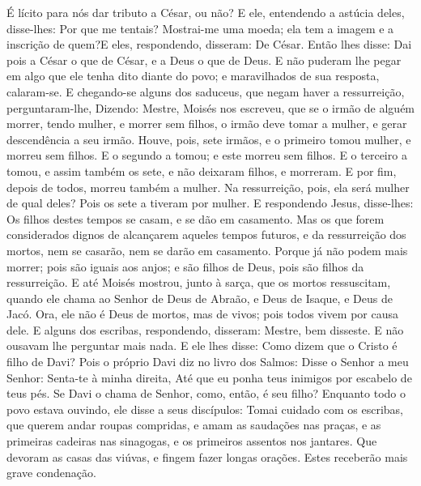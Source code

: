{  É lícito para nós dar tributo a César, ou não?
  E ele, entendendo a astúcia deles, disse-lhes: Por que me tentais?
  Mostrai-me uma moeda; ela tem a imagem e a inscrição de quem?E eles, respondendo, disseram: De César.
  Então lhes disse: Dai pois a César o que
{} de César, e a Deus o que
{} de Deus.
  E não puderam lhe pegar em algo que ele tenha dito diante do povo; e maravilhados de sua resposta, calaram-se.
  E chegando-se alguns dos saduceus, que negam haver a ressurreição, perguntaram-lhe,
  Dizendo: Mestre, Moisés nos escreveu, que se o irmão de alguém morrer, tendo mulher, e morrer sem filhos, o irmão deve tomar a mulher, e gerar descendência a seu irmão.
  Houve, pois, sete irmãos, e o primeiro tomou mulher, e morreu sem filhos.
  E o segundo a tomou; e
{} este morreu sem filhos.
  E o terceiro a tomou, e assim também os sete, e não deixaram filhos, e morreram.
  E por fim, depois de todos, morreu também a mulher.
  Na ressurreição, pois, ela será mulher de qual deles? Pois os sete a tiveram por mulher.
  E respondendo Jesus, disse-lhes: Os filhos destes tempos se casam, e se dão em casamento.
  Mas os que forem considerados dignos de alcançarem aqueles tempos futuros, e da ressurreição dos mortos, nem se casarão, nem se darão em casamento.
  Porque já não podem mais morrer; pois são iguais aos anjos; e são filhos de Deus, pois são filhos da ressurreição.
  E até Moisés mostrou, junto à sarça, que os mortos ressuscitam, quando ele chama ao Senhor de Deus de Abraão, e Deus de Isaque, e Deus de Jacó.
  Ora, ele não é Deus de mortos, mas de vivos; pois todos vivem por causa dele.
  E alguns dos escribas, respondendo, disseram: Mestre, bem disseste.
  E não ousavam lhe perguntar mais nada.
  E ele lhes disse: Como dizem que o Cristo é filho de Davi?
  Pois o próprio Davi diz no livro dos Salmos: Disse o Senhor a meu Senhor: Senta-te à minha direita,
  Até que eu ponha teus inimigos por escabelo de teus pés.
  Se Davi o chama de Senhor, como, então, é seu filho?
  Enquanto todo o povo estava ouvindo, ele disse a seus discípulos:
  Tomai cuidado com os escribas, que querem andar roupas compridas, e amam as saudações nas praças, e as primeiras cadeiras nas sinagogas, e os primeiros assentos nos jantares.
  Que devoram as casas das viúvas, e fingem fazer longas orações. Estes receberão mais grave condenação.
\par }

